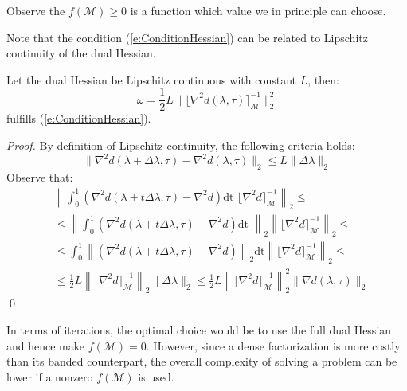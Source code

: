 \begin{remark}
Observe the $f(\mathcal{M}) \geq 0$ is a function which value we in principle can choose.
\end{remark}
Note that the condition (\ref{e:ConditionHessian}) can be related to Lipschitz continuity of the dual Hessian.
\begin{proposition}
Let the dual Hessian be Lipschitz continuous with constant $L$, then:
\begin{equation}
\omega = \frac{1}{2} L \| \lfloor \nabla^2 d(\lambda, \tau) \rceil_{\mathcal{M}}^{-1} \|_2^2
\end{equation}
fulfills (\ref{e:ConditionHessian}).
\end{proposition}
\begin{proof}
By definition of Lipschitz continuity, the following criteria holds:
\begin{equation}
\| \nabla^2 d(\lambda + \Delta \lambda, \tau) - \nabla^2 d(\lambda, \tau) \|_2 \leq L \| \Delta \lambda \|_2
\end{equation} 
Observe that:
\begin{equation}
\begin{aligned}
& \left\| \int_0^1 ( \nabla^2 d(\lambda + t \Delta \lambda, \tau) - \nabla^2 d ) \text{dt } \lfloor \nabla^2 d \rceil_{\mathcal{M}}^{-1} \right\|_2 \leq \\
& \leq \left\| \int_0^1 ( \nabla^2 d(\lambda + t \Delta \lambda, \tau) - \nabla^2 d ) \text{dt } \right\|_2 \left\| \lfloor \nabla^2 d \rceil_{\mathcal{M}}^{-1} \right\|_2 \leq \\
& \leq \int_0^1 \left\| ( \nabla^2 d(\lambda + t \Delta \lambda, \tau) - \nabla^2 d ) \right\|_2 \text{dt} \left\| \lfloor \nabla^2 d \rceil_{\mathcal{M}}^{-1} \right\|_2 \leq \\
& \leq \frac{1}{2} L \left\| \lfloor \nabla^2 d \rceil_{\mathcal{M}}^{-1} \right\|_2 \| \Delta \lambda \|_2 \leq \frac{1}{2} L \left\| \lfloor \nabla^2 d \rceil_{\mathcal{M}}^{-1} \right\|_2^2 \| \nabla d(\lambda, \tau) \|_2
\end{aligned}
\end{equation}
\qed
\end{proof}

In terms of iterations, the optimal choice would be to use the full dual Hessian and hence make $f(\mathcal{M}) = 0$. However, since a dense factorization is more costly than its banded counterpart, the overall complexity of solving a problem can be lower if a nonzero $f(\mathcal{M})$ is used.

